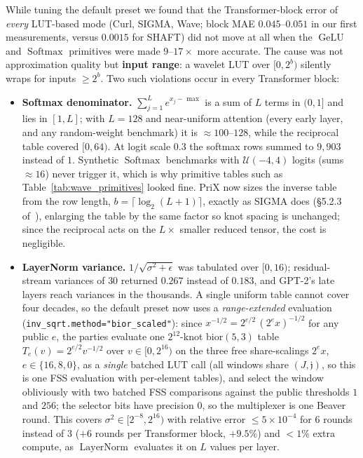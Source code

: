 \documentclass[11pt]{article}
\begin{document}
While tuning the default preset we found that the Transformer-block error of \emph{every} LUT-based mode (Curl, SIGMA, Wave; block MAE $0.045$--$0.051$ in our first measurements, versus $0.0015$ for SHAFT) did not move at all when the $\operatorname{GeLU}$ and $\operatorname{Softmax}$ primitives were made $9$--$17\times$ more accurate. The cause was not approximation quality but \textbf{input range}: a wavelet LUT over $[0, 2^{b})$ silently wraps for inputs $\geq 2^b$. Two such violations occur in every Transformer block:
\begin{itemize}
    \item \textbf{Softmax denominator.} $\sum_{j=1}^{L} e^{x_j - \max}$ is a sum of $L$ terms in $(0,1]$ and lies in $[1, L]$; with $L=128$ and near-uniform attention (every early layer, and any random-weight benchmark) it is $\approx 100$--$128$, while the reciprocal table covered $[0, 64)$. At logit scale $0.3$ the softmax rows summed to $9{,}903$ instead of $1$. Synthetic $\operatorname{Softmax}$ benchmarks with $\mathcal{U}(-4,4)$ logits (sums $\approx 16$) never trigger it, which is why primitive tables such as Table~\ref{tab:wave_primitives} looked fine. PriX now sizes the inverse table from the row length, $b = \lceil \log_2 (L+1) \rceil$, exactly as SIGMA does (\S5.2.3 of~\cite{gupta2024sigma}), enlarging the table by the same factor so knot spacing is unchanged; since the reciprocal acts on the $L\times$ smaller reduced tensor, the cost is negligible.
    \item \textbf{LayerNorm variance.} $1/\sqrt{\sigma^2 + \epsilon}$ was tabulated over $[0, 16)$; residual-stream variances of $30$ returned $0.267$ instead of $0.183$, and GPT-2's late layers reach variances in the thousands. A single uniform table cannot cover four decades, so the default preset now uses a \emph{range-extended} evaluation (\texttt{inv\_sqrt.method="bior\_scaled"}): since $x^{-1/2} = 2^{e/2}\,(2^{e}x)^{-1/2}$ for any public $e$, the parties evaluate one $2^{12}$-knot $\text{bior}(5,3)$ table $T_e(v) = 2^{e/2}v^{-1/2}$ over $v \in [0, 2^{16})$ on the three free share-scalings $2^{e}x$, $e \in \{16, 8, 0\}$, as a \emph{single} batched LUT call (all windows share $(J, \mathfrak{j})$, so this is one FSS evaluation with per-element tables), and select the window obliviously with two batched FSS comparisons against the public thresholds $1$ and $256$; the selector bits have precision $0$, so the multiplexer is one Beaver round. This covers $\sigma^2 \in [2^{-8}, 2^{16})$ with relative error $\leq 5\times 10^{-4}$ for $6$ rounds instead of $3$ ($+6$ rounds per Transformer block, $+9.5\%$) and $<1\%$ extra compute, as $\operatorname{LayerNorm}$ evaluates it on $L$ values per layer.
\end{itemize}
\end{document}
